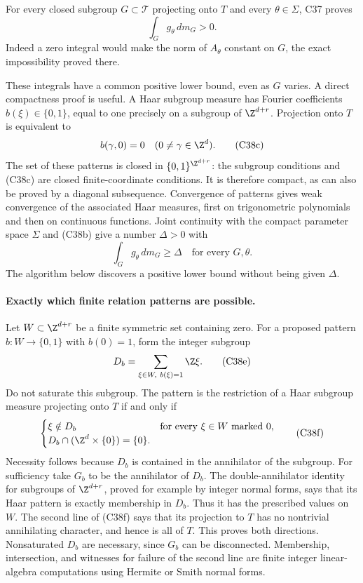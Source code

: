 For every closed subgroup $G\subset\mathcal T$ projecting onto
$T$ and every $\theta\in\Sigma$, C37 proves
\[
                     \int_G g_\theta\,dm_G>0.
 \tag{C38b}
\]
Indeed a zero integral would make the norm of $A_\theta$ constant
on $G$, the exact impossibility proved there.

These integrals have a common positive lower bound, even as $G$
varies.  A direct compactness proof is useful.  A Haar subgroup
measure has Fourier coefficients $b(\xi)\in\{0,1\}$, equal to
one precisely on a subgroup of $\Z^{d+r}$.  Projection onto $T$
is equivalent to
\[
       b(\gamma,0)=0\quad(0\ne\gamma\in\Z^d).
 \tag{C38c}
\]
The set of these patterns is closed in
$\{0,1\}^{\Z^{d+r}}$: the subgroup conditions and (C38c) are
closed finite-coordinate conditions.  It is therefore compact,
as can also be proved by a diagonal subsequence.  Convergence of
patterns gives weak convergence of the associated Haar measures,
first on trigonometric polynomials and then on continuous
functions.  Joint continuity with the compact parameter space
$\Sigma$ and (C38b) give a number $\Delta>0$ with
\[
                \int_Gg_\theta\,dm_G\ge\Delta
                       \quad\text{for every }G,\theta.
 \tag{C38d}
\]
The algorithm below discovers a positive lower bound without
being given $\Delta$.

\paragraph{Exactly which finite relation patterns are possible.}
Let $W\subset\Z^{d+r}$ be a finite symmetric set containing zero.
For a proposed pattern $b:W\to\{0,1\}$ with $b(0)=1$, form
the integer subgroup
\[
              D_b=\sum_{\xi\in W,\ b(\xi)=1}\Z\xi.
 \tag{C38e}
\]
Do not saturate this subgroup.  The pattern is the restriction of
a Haar subgroup measure projecting onto $T$ if and only if
\[
 \begin{cases}
 \xi\notin D_b&\text{for every }\xi\in W\text{ marked }0,\\
 D_b\cap(\Z^d\times\{0\})=\{0\}.&
 \end{cases}
 \tag{C38f}
\]
Necessity follows because $D_b$ is contained in the annihilator
of the subgroup.  For sufficiency take $G_b$ to be the
annihilator of $D_b$.  The double-annihilator identity for
subgroups of $\Z^{d+r}$, proved for example by integer normal
forms, says that its Haar pattern is exactly membership in
$D_b$.  Thus it has the prescribed values on $W$.  The second
line of (C38f) says that its projection to $T$ has no nontrivial
annihilating character, and hence is all of $T$.  This proves
both directions.  Nonsaturated $D_b$ are necessary, since $G_b$
can be disconnected.  Membership, intersection, and witnesses for
failure of the second line are finite integer linear-algebra
computations using Hermite or Smith normal forms.

